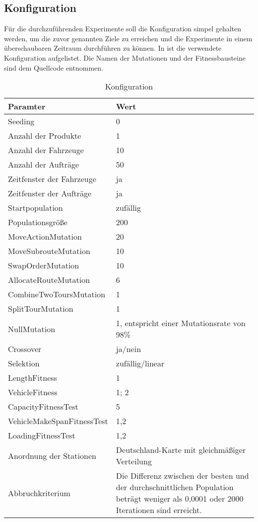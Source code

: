\subsection{Konfiguration}
\label{sec:Konfiguration}
Für die durchzuführenden Experimente soll die Konfiguration simpel gehalten werden, um die zuvor genannten Ziele zu erreichen und die Experimente in einem überschaubaren Zeitraum durchführen zu können. In  ist die verwendete Konfiguration aufgelistet. Die Namen der Mutationen und der Fitnessbausteine sind dem Quellcode entnommen.

\begin{table}[ht!]
 \caption{Konfiguration}
 \begin{tabular}{lp{10cm}}
 \toprule
 \textbf {Paramter} & \textbf{Wert} \\
 \toprule
 Seeding & 0 \\
 \midrule
 Anzahl der Produkte & 1 \\
 \midrule
 Anzahl der Fahrzeuge & 10 \\
 \midrule
 Anzahl der Aufträge & 50 \\
 \midrule
 Zeitfenster der Fahrzeuge & ja \\
 \midrule
 Zeitfenster der Aufträge & ja \\
 \midrule
 Startpopulation & zufällig \\
 \midrule
 Populationsgröße & 200 \\
 \midrule
 MoveActionMutation & 20 \\
 \midrule
 MoveSubrouteMutation & 10 \\
 \midrule
 SwapOrderMutation & 10 \\
 \midrule
 AllocateRouteMutation & 6 \\
 \midrule
 CombineTwoToursMutation & 1 \\
 \midrule
 SplitTourMutation & 1 \\
 \midrule
 NullMutation & 1, entspricht einer Mutationsrate von 98\% \\
 \midrule
 Crossover & ja/nein \\
 \midrule
 Selektion & zufällig/linear \\
 \midrule
 LengthFitness & 1 \\
 \midrule
 VehicleFitness & 1; 2 \\
 \midrule
 CapacityFitnessTest & 5 \\
 \midrule
 VehicleMakeSpanFitnessTest & 1,2 \\
 \midrule
 LoadingFitnessTest & 1,2 \\
 \midrule
 Anordnung der Stationen & Deutschland-Karte mit gleichmäßiger Verteilung \\
 \midrule
 Abbruchkriterium & Die Differenz zwischen der besten und der durchschnittlichen Population beträgt weniger als 0,0001 oder 2000 Iterationen sind erreicht. \\
 \bottomrule
 \end{tabular}
 \label{tab:Konfiguration}
\end{table}

